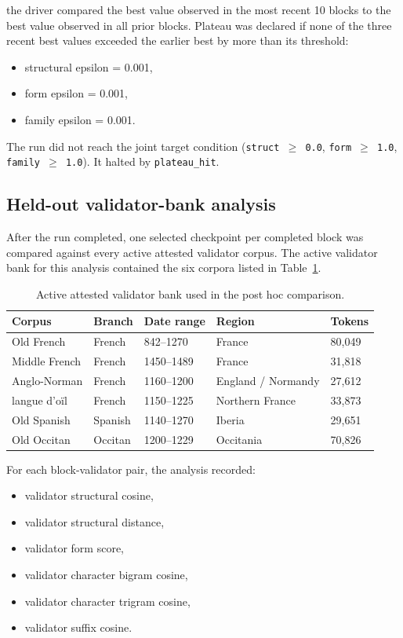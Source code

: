 \documentclass[11pt]{article}
\begin{document}
the driver compared the best value observed in the most recent 10 blocks to the
best value observed in all prior blocks. Plateau was declared if none of the
three recent best values exceeded the earlier best by more than its threshold:

\begin{itemize}
    \item structural epsilon = 0.001,
    \item form epsilon = 0.001,
    \item family epsilon = 0.001.
\end{itemize}

The run did not reach the joint target condition
(\texttt{struct $\geq$ 0.0}, \texttt{form $\geq$ 1.0},
\texttt{family $\geq$ 1.0}). It halted by \texttt{plateau\_hit}.

\subsection{Held-out validator-bank analysis}

After the run completed, one selected checkpoint per completed block was
compared against every active attested validator corpus. The active validator
bank for this analysis contained the six corpora listed in
Table~\ref{tab:validatorbank}.

\begin{table}[h]
\centering
\caption{Active attested validator bank used in the post hoc comparison.}
\label{tab:validatorbank}
\begin{tabular}{lllll}
\toprule
Corpus & Branch & Date range & Region & Tokens \\
\midrule
Old French & French & 842--1270 & France & 80{,}049 \\
Middle French & French & 1450--1489 & France & 31{,}818 \\
Anglo-Norman & French & 1160--1200 & England / Normandy & 27{,}612 \\
langue d'o\"il & French & 1150--1225 & Northern France & 33{,}873 \\
Old Spanish & Spanish & 1140--1270 & Iberia & 29{,}651 \\
Old Occitan & Occitan & 1200--1229 & Occitania & 70{,}826 \\
\bottomrule
\end{tabular}
\end{table}

For each block-validator pair, the analysis recorded:

\begin{itemize}
    \item validator structural cosine,
    \item validator structural distance,
    \item validator form score,
    \item validator character bigram cosine,
    \item validator character trigram cosine,
    \item validator suffix cosine.
\end{itemize}
\end{document}
